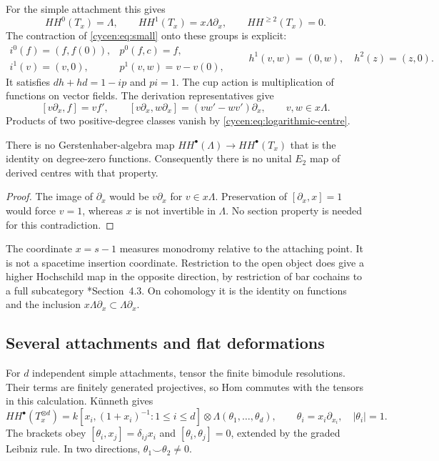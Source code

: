 For the simple attachment this gives
\begin{equation}\label{cycen:eq:logarithmic-centre}
 HH^0(T_x)=\Lambda,\qquad
 HH^1(T_x)=x\Lambda\partial_x,\qquad HH^{\geq2}(T_x)=0.
\end{equation}
The contraction of \eqref{cycen:eq:small} onto these groups
is explicit:
\[
 \begin{array}{ll}
 i^0(f)=(f,f(0)),&p^0(f,c)=f,\\
 i^1(v)=(v,0),&p^1(v,w)=v-v(0),
 \end{array}
 \qquad
 h^1(v,w)=(0,w),\quad h^2(z)=(z,0).
\]
It satisfies $dh+hd=1-ip$ and $pi=1$. The cup action is
multiplication of functions on vector fields. The derivation
representatives give
\begin{equation}\label{cycen:eq:logarithmic-bracket}
 [v\partial_x,f]=vf',\qquad
 [v\partial_x,w\partial_x]=(vw'-wv')\partial_x,
 \qquad v,w\in x\Lambda.
\end{equation}
Products of two positive-degree classes vanish by
\eqref{cycen:eq:logarithmic-centre}.

\begin{corollary}\label{cycen:cor:missing-derivative}
There is no Gerstenhaber-algebra map
$HH^\bullet(\Lambda)\to HH^\bullet(T_x)$ that is the identity
on degree-zero functions. Consequently there is no unital
$E_2$ map of derived centres with that property.
\end{corollary}
\begin{proof}
The image of $\partial_x$ would be $v\partial_x$ for
$v\in x\Lambda$. Preservation of $[\partial_x,x]=1$
would force $v=1$, whereas $x$ is not invertible in
$\Lambda$. No section property is needed for this contradiction.
\end{proof}

The coordinate $x=s-1$ measures monodromy relative to the
attaching point. It is not a spacetime insertion coordinate.
Restriction to the open object does give a higher Hochschild
map in the opposite direction, by restriction of bar cochains
to a full subcategory \cite{cycen:KellerHigher}*{Section~4.3}.
On cohomology it is the identity on functions and the
inclusion $x\Lambda\partial_x\subset\Lambda\partial_x$.

\subsection{Several attachments and flat deformations}

For $d$ independent simple attachments, tensor the finite
bimodule resolutions. Their terms are finitely generated
projectives, so Hom commutes with the tensors in this
calculation. K\"unneth gives
\begin{equation}\label{cycen:eq:log-polyvectors}
 HH^\bullet(T_x^{\otimes d})=
 k[x_i,(1+x_i)^{-1}:1\leq i\leq d]
   \otimes\Lambda(\theta_1,\ldots,\theta_d),
 \qquad \theta_i=x_i\partial_{x_i},\quad |\theta_i|=1.
\end{equation}
The brackets obey $[\theta_i,x_j]=\delta_{ij}x_i$ and
$[\theta_i,\theta_j]=0$, extended by the graded Leibniz rule.
In two directions, $\theta_1\smile\theta_2\ne0$.

